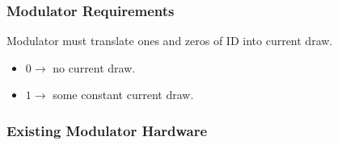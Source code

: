 \documentclass{beamer}
\begin{document}
	\begin{frame}\frametitle{Modulator Requirements}
		Modulator must translate ones and zeros of ID into current draw.
		\begin{itemize}
			\item $0 \rightarrow$ no current draw.
			\item $1 \rightarrow$ some constant current draw.
		\end{itemize}
	\end{frame}





	\begin{frame}\frametitle{Existing Modulator Hardware}


\end{frame}
\end{document}
